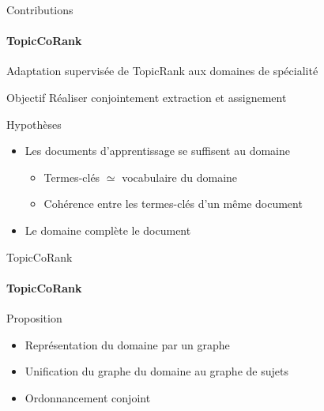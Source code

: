 \begin{frame}{Contributions}\framesubtitle{TopicCoRank}
  Adaptation supervisée de TopicRank aux domaines de spécialité

  \vspace{1em}

  \begin{block}{Objectif}
    Réaliser conjointement extraction et assignement
  \end{block}

  \vspace{1em}

  \begin{block}{Hypothèses}
    \begin{itemize}
      \item{Les documents d'apprentissage se suffisent au domaine}
      \begin{itemize}
        \item{Termes-clés $\simeq$ vocabulaire du domaine}
        \item{Cohérence entre les termes-clés d'un même document}
      \end{itemize}
      \item{Le domaine complète le document}
    \end{itemize}
  \end{block}
\end{frame}

\begin{frame}{TopicCoRank}\framesubtitle{TopicCoRank}
  \begin{block}{Proposition}
    \begin{itemize}
      \item{Représentation du domaine par un graphe}
      \item{Unification du graphe du domaine au graphe de sujets}
      \item{Ordonnancement conjoint}
    \end{itemize}
  \end{block}
\end{frame}

